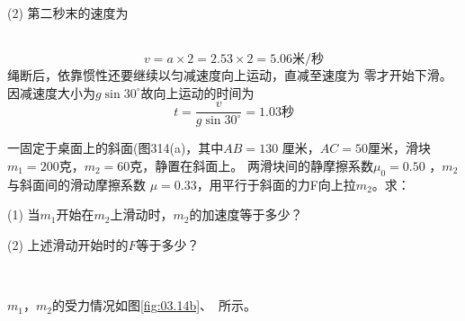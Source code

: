 (2) 第二秒末的速度为

~\vspace{-1.56em}
\begin{equation*}
	v = a \times 2 = 2 . 5 3 \times 2 = 5 . 0 6 \text{米/秒}
\end{equation*}
绳断后，依靠惯性还要继续以匀减速度向上运动，直减至速度为
零才开始下滑。因减速度大小为$  g \sin 3 0 ^ { \circ } $故向上运动的时间为
\begin{equation*}
	t = \frac { v } { g \sin 3 0 ^ { \circ } } = 1 . 0 3\text{秒}
\end{equation*}

\example 一固定于桌面上的斜面(图314(a)，其中$  A B = 1 3 0  $
厘米，$  A C = 5 0  $厘米，滑块$  m _ { 1 } = 2 0 0  $克，$  m _ { 2 } = 6 0  $克，静置在斜面上。
两滑块间的静摩擦系数$  \mu _ { 0 } = 0 . 5 0 $ ，$m_2$与斜面间的滑动摩擦系数
$ \mu = 0 . 3 3  $，用平行于斜面的力F向上拉$m_2$。求：

(1) 当$m_1$开始在$m_2$上滑动时，$m_2$的加速度等于多少？

(2) 上述滑动开始时的$ F $等于多少？
\begin{figurex}
	\centering
	\\[-0.5em]
	 \qquad
	\caption{}
	\label{fig:03.14}
\end{figurex}

\solution $m_1$，$m_2$的受力情况如图\ref{fig:03.14b}、~所示。

